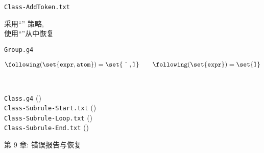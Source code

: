 \begin{frame}{}
  \begin{center}
    \texttt{Class-AddToken.txt}

    \vspace{0.30cm}
  \end{center}
\end{frame}

\begin{frame}{}
  \begin{center}
    采用``'' 策略, \\[5pt]
    使用``''从中恢复

    \vspace{1.00cm}
    \texttt{Group.g4} \\[15pt]
  \end{center}
\end{frame}

\begin{frame}{}
  \[
    \following(\set{\texttt{expr}, \texttt{atom}}) = \set{\hat{\quad}, \texttt{]}} \qquad
    \following(\set{\texttt{expr}}) = \set{\texttt{]}}
  \]
  \begin{columns}
  \end{columns}

  \pause
  \vspace{0.60cm}
  \begin{center}
  \end{center}
\end{frame}

\begin{frame}{}
  \begin{center}
     \\[20pt]

    \texttt{Class.g4} (\texttt{}) \\[20pt]
    \texttt{Class-Subrule-Start.txt} () \\[10pt]
    \texttt{Class-Subrule-Loop.txt} () \\[10pt]
    \texttt{Class-Subrule-End.txt} ()
  \end{center}
\end{frame}

\begin{frame}{}

  \begin{center}
    第 9 章: 错误报告与恢复
  \end{center}
\end{frame}

